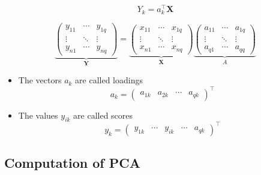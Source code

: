 \documentclass[a4paper]{article}
\begin{document}
\begin{equation*}
    Y_k=a_k^{\intercal}\mathbf{X}
\end{equation*}

\begin{equation*}
    \underbrace{
    \begin{pmatrix}
    y_{11} & \cdots & y_{1q} \\
    \vdots & \ddots & \vdots \\
    y_{n1} & \cdots & y_{nq}
    \end{pmatrix}
    }_{\mathbf{Y}}
    =
    \underbrace{
    \begin{pmatrix}
    x_{11} & \cdots & x_{1q} \\
    \vdots & \ddots & \vdots \\
    x_{n1} & \cdots & x_{nq}
    \end{pmatrix}
    }_{\mathbf{X}}
    \underbrace{
    \begin{pmatrix}
    a_{11} & \cdots & a_{1q} \\
    \vdots & \ddots & \vdots \\
    a_{q1} & \cdots & a_{qq}
    \end{pmatrix}
    }_{A}
\end{equation*}

\begin{itemize}
    \item The vectors $a_k$ are called loadings
    \begin{equation*}
        a_k=
        \begin{pmatrix}
        a_{1k} & a_{2k} & \cdots & a_{qk}
        \end{pmatrix}^{\intercal}
    \end{equation*}
    \item The values $y_{ik}$ are called scores
    \begin{equation*}
        y_k=
        \begin{pmatrix}
        y_{1k} & \cdots & y_{ik} & \cdots & a_{qk}
        \end{pmatrix}^{\intercal}
    \end{equation*}
\end{itemize}

\subsection{Computation of PCA}
\end{document}
